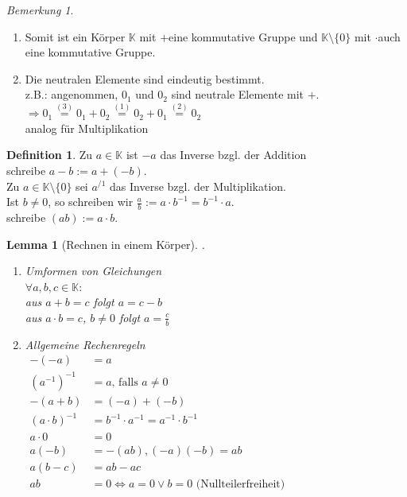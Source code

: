 \documentclass[12pt,a4paper,titlepage]{article} %
\newtheorem{lem}{Lemma}
\theoremstyle{definition}
\newtheorem{defi}{Definition}[subsection]
\theoremstyle{remark}
\newtheorem*{bem}{Bemerkung}
\begin{document}
\begin{bem}
	\begin{enumerate}.%
		\item Somit ist ein Körper $\mathbb{K}$ mit \glqq $+$\grqq eine kommutative Gruppe und $\mathbb{K} \setminus \{0\}$ mit \glqq $\cdot$\grqq auch eine kommutative Gruppe.
		\item Die neutralen Elemente sind eindeutig bestimmt.\\
		z.B.: angenommen, $0_1$ und $0_2$ sind neutrale Elemente mit \glqq $+$\grqq .\\
		$\Rightarrow 0_1 \overset{(3)}{=} 0_1 + 0_2 \overset{(1)}{=} 0_2 + 0_1 \overset{(2)}{=} 0_2$\\
		analog für Multiplikation
	\end{enumerate}
\end{bem}
\begin{defi}
	Zu $a\in \mathbb{K}$ ist $-a$ das Inverse bzgl. der Addition\\
	schreibe $a-b := a + (-b)$.\\
	Zu $a\in\mathbb{K}\setminus\{0\}$ sei $a^{/1}$ das Inverse bzgl. der Multiplikation.\\
	Ist $b\neq 0$, so schreiben wir $\frac{a}{b} := a\cdot b^{-1} =b^{-1}\cdot a$.\\
	schreibe $(ab) := a\cdot b$.
\end{defi}
\begin{lem}[Rechnen in einem Körper].%
	\begin{enumerate}
	\item Umformen von Gleichungen\\
	$\forall a,b,c\in\mathbb{K}:$\\
	aus $a+b=c$ folgt $a=c-b$\\
	aus $a\cdot b=c$, $b\neq 0$ folgt $a=\frac{c}{b}$
	\item Allgemeine Rechenregeln\\
	$\begin{aligned}
		-(-a) &= a\\
		(a^{-1})^{-1}&=a\text{, falls }a\neq 0\\
		-(a+b) &= (-a) + (-b)\\
		(a\cdot b)^{-1}&=b^{-1}\cdot a^{-1}=a^{-1}\cdot b^{-1}\\
		a\cdot 0&=0\\
		a(-b)&=-(ab), (-a)(-b)=ab\\
		a(b-c) &= ab - ac\\
		ab &= 0 \Leftrightarrow a = 0 \vee b = 0 \text{ (Nullteilerfreiheit)}\\ 
	\end{aligned}$
	\end{enumerate}
\end{lem}
\end{document}

